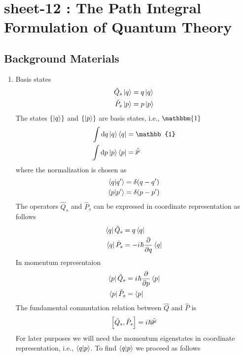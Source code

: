 \chapter{sheet-12 : The Path Integral Formulation of Quantum Theory}
\ifpdf
\graphicspath{{Chapter12/figs/}}
\else
\graphicspath{{Chapter12/figs/}}
\fi


\section{Background Materials}
\begin{enumerate}
	\item Basis states \\
	\begin{align}
		\hat{Q}_s \ket{q} &= q\ket{q} \\
		\hat{P}_s \ket{p} &= p\ket{p} 
	\end{align}
	The states $\{\ket{q}\}$ and $\{\ket{p}\}$ are basis states, i.e., $\mathbbm{1}$
	\begin{align}
		\int \dd{q} \ket{q}\bra{q} &= \mathbb{1} \\
		\int \dd{p} \ket{p}\bra{p} &= \mathbb{\hat{1}} \\
	\end{align}
	where the normalization is chosen as
	\begin{align}
		\braket{q}{q^\prime} &= \delta(q-q^\prime) \\
		\braket{p}{p^\prime} &= \delta(p-p^\prime) 
	\end{align}
	The operators $\hat{Q}_s$ and $\hat{P}_s$ can be expressed in coordinate representation as follows
	\begin{align}
		\bra{q}\hat{Q}_s &= q \bra{q} \\
		\bra{q}\hat{P}_s &= -{i\mkern1mu} \hbar \pdv{q} \bra{q} 
	\end{align}
	In momentum representaion
	\begin{align}
		\bra{p}\hat{Q}_s &= {i\mkern1mu} \hbar \pdv{p} \bra{p} \\
		\bra{p}\hat{P}_s &=  \bra{p} 
	\end{align}
	The fundamental commutation relation between $\hat{Q}$ and $\hat{P}$ is 
	\begin{equation}
		\left[\hat{Q}_s, \hat{P}_s\right] = {i\mkern1mu}
		 \hbar \mathbb{\hat{1}}
	\end{equation}
	For later purposes we will need the momentum eigenstates in coordinate representation, i.e., $\braket{q}{p}$. To find $\braket{q}{p}$ we proceed as follows
	\begin{align}

\end{align}
\end{enumerate}
